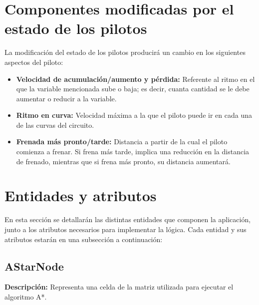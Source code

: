 \section{Componentes modificadas por el estado de los pilotos}
\label{sec:componente-estado}

La modificación del estado de los pilotos producirá un cambio en los siguientes aspectos del piloto:

\begin{itemize}
    \item \textbf{Velocidad de acumulación/aumento y pérdida: }Referente al ritmo en el que la variable mencionada sube o baja; es decir, cuanta cantidad se le debe aumentar o reducir a la variable.
    \item \textbf{Ritmo en curva: }Velocidad máxima a la que el piloto puede ir en cada una de las curvas del circuito.
    \item \textbf{Frenada más pronto/tarde: }Distancia a partir de la cual el piloto comienza a frenar. Si frena más tarde, implica una reducción en la distancia de frenado, mientras que si frena más pronto, su distancia aumentará.
\end{itemize}

\section{Entidades y atributos}

En esta sección se detallarán las distintas entidades que componen la aplicación, junto a los atributos necesarios para implementar la lógica. Cada entidad y sus atributos estarán en una subsección a continuación:

\subsection{AStarNode}
\textbf{Descripción: }Representa una celda de la matriz utilizada para ejecutar el algoritmo A*.


